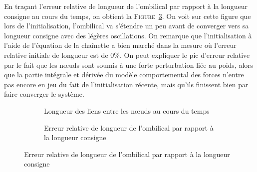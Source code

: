 			En traçant l'erreur relative de longueur de l'ombilical par rapport à la longueur consigne au cours du temps, on obtient la \textsc{Figure}~\ref{fig:error_length}. On voit sur cette figure que lors de l'initialisation, l'ombilical va s'étendre un peu avant de converger vers sa longueur consigne avec des légères oscillations. On remarque que l'initialisation à l'aide de l'équation de la chaînette a bien marché dans la mesure où l'erreur relative initiale de longueur est de $0 \%$. On peut expliquer le pic d'erreur relative par le fait que les n\oe uds sont soumis à une forte perturbation liée au poids, alors que la partie intégrale et dérivée du modèle comportemental des forces n'entre pas encore en jeu du fait de l'initialisation récente, mais qu'ils finissent bien par faire converger le système.

			\begin{figure}[!htb]
				\begin{subfigure}[t]{0.45\textwidth}
					\scalebox{0.8}{}
					\caption{Longueur des liens entre les n\oe uds au cours du temps}
					\label{fig:length}
				\end{subfigure}
				\hfill
				\begin{subfigure}[t]{0.45\textwidth}
					\scalebox{0.8}{}
					\caption{Erreur relative de longueur de l'ombilical par rapport à la longueur consigne}
					\label{fig:error_length}
				\end{subfigure}
			\end{figure}